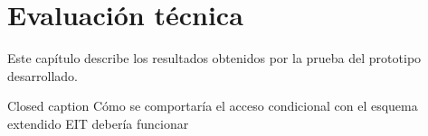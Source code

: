 \ifx\all\undefined


\fi
 
\chapter{Evaluación técnica}

Este capítulo describe los resultados obtenidos por la prueba del prototipo desarrollado.

Closed caption
Cómo se comportaría el acceso condicional con el esquema extendido
EIT debería funcionar

\ifx\all\undefined

\fi